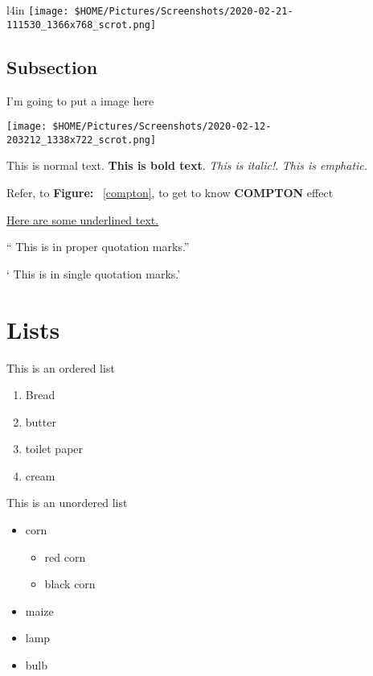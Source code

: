 \documentclass{article}	%
\begin{document}
\blindtext
\blindtext
\begin{wrapfigure}{l}{4in}
	\centering
	\texttt{[image: \$HOME/Pictures/Screenshots/2020-02-21-111530\_1366x768\_scrot.png]}
	\caption{compton effect\label{compton}}
\end{wrapfigure}
\blindtext
\blindtext
\blindtext
\blindtext
\blindtext

	\subsection{Subsection}

	I'm going to put a image here

\begin{center}
\texttt{[image: \$HOME/Pictures/Screenshots/2020-02-12-203212\_1338x722\_scrot.png]}
\end{center}

		This is normal text. \textbf{This is bold text}. \textit{This is italic!}. \emph{This is emphatic.}

		Refer, to \textbf{Figure: }~\ref{compton}, to get to know \textbf{COMPTON} effect

		\underline{Here are some underlined text.}


		`` This is in proper quotation marks.''

		` This is in single quotation marks.'

\section{Lists\label{list}}

This is an ordered list

\begin{enumerate}
	\item Bread\label{bread}
	\item butter
	\item toilet paper
	\item cream
\end{enumerate}

This is an unordered list

\begin{itemize}
		\item corn
			\begin{itemize}
				\item red corn
				\item black corn
			\end{itemize}
		\item maize
		\item lamp
		\item bulb
\end{itemize}
\end{document}
